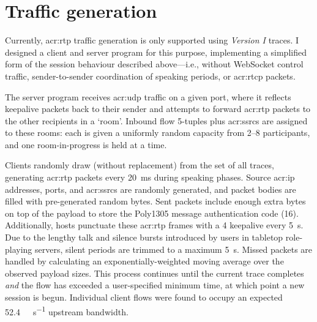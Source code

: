 \section{Traffic generation}
Currently, \gls{acr:rtp} traffic generation is only supported using \emph{Version \RN{1}} traces.
I designed a client and server program for this purpose, implementing a simplified form of the session behaviour described above---i.e., without WebSocket control traffic, sender-to-sender coordination of speaking periods, or \gls{acr:rtcp} packets.

The server program receives \gls{acr:udp} traffic on a given port, where it reflects keepalive packets back to their sender and attempts to forward \gls{acr:rtp} packets to the other recipients in a `room'.
Inbound flow 5-tuples plus \glspl{acr:ssrc} are assigned to these rooms: each is given a uniformly random capacity from \numrange{2}{8} participants, and one room-in-progress is held at a time.

Clients randomly draw (without replacement) from the set of all traces, generating \gls{acr:rtp} packets every \qty{20}{\milli\second} during speaking phases.
Source \gls{acr:ip} addresses, ports, and \glspl{acr:ssrc} are randomly generated, and packet bodies are filled with pre-generated random bytes.
Sent packets include enough extra bytes on top of the payload to store the Poly1305 message authentication code (\qty{16}{\byte}).
Additionally, hosts punctuate these \gls{acr:rtp} frames with a \qty{4}{\byte} keepalive every \qty{5}{\second}.
Due to the lengthy talk and silence bursts introduced by users in tabletop role-playing servers, silent periods are trimmed to a maximum \qty{5}{\second}.
Missed packets are handled by calculating an exponentially-weighted moving average over the observed payload sizes.
This process continues until the current trace completes \emph{and} the flow has exceeded a user-specified minimum time, at which point a new session is begun.
Individual client flows were found to occupy an expected \qty{52.4}{\kilo\bit\per\second} upstream bandwidth.

%


